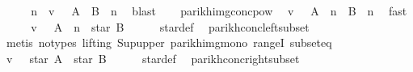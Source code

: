 \begin{isabellebody}
\ \ \isamarkupfalse%
\ \isamarkupfalse%
\ n\ \ {\isachardoublequoteopen}v\ {\isasymin}\ {\isasymPsi}\ {\isacharparenleft}{\kern0pt}{\isacharparenleft}{\kern0pt}A\ {\isacharat}{\kern0pt}{\isacharat}{\kern0pt}\ B{\isacharparenright}{\kern0pt}\ {\isacharcircum}{\kern0pt}{\isacharcircum}{\kern0pt}\ n{\isacharparenright}{\kern0pt}{\isachardoublequoteclose}\ \isamarkupfalse%
\ blast\isanewline
\ \ \isamarkupfalse%
\ parikh{\isacharunderscore}{\kern0pt}img{\isacharunderscore}{\kern0pt}conc{\isacharunderscore}{\kern0pt}pow\ \isamarkupfalse%
\ {\isachardoublequoteopen}v\ {\isasymin}\ {\isasymPsi}\ {\isacharparenleft}{\kern0pt}A\ {\isacharcircum}{\kern0pt}{\isacharcircum}{\kern0pt}\ n\ {\isacharat}{\kern0pt}{\isacharat}{\kern0pt}\ B\ {\isacharcircum}{\kern0pt}{\isacharcircum}{\kern0pt}\ n{\isacharparenright}{\kern0pt}{\isachardoublequoteclose}\ \isamarkupfalse%
\ fast\isanewline
\ \ \isamarkupfalse%
\ \isamarkupfalse%
\ {\isachardoublequoteopen}v\ {\isasymin}\ {\isasymPsi}\ {\isacharparenleft}{\kern0pt}A\ {\isacharcircum}{\kern0pt}{\isacharcircum}{\kern0pt}\ n\ {\isacharat}{\kern0pt}{\isacharat}{\kern0pt}\ star\ B{\isacharparenright}{\kern0pt}{\isachardoublequoteclose}\isanewline
\ \ \ \ \isamarkupfalse%
\ star{\isacharunderscore}{\kern0pt}def\ \isamarkupfalse%
\ parikh{\isacharunderscore}{\kern0pt}conc{\isacharunderscore}{\kern0pt}left{\isacharunderscore}{\kern0pt}subset\isanewline
\ \ \ \ \isamarkupfalse%
\ {\isacharparenleft}{\kern0pt}metis\ {\isacharparenleft}{\kern0pt}no{\isacharunderscore}{\kern0pt}types{\isacharcomma}{\kern0pt}\ lifting{\isacharparenright}{\kern0pt}\ Sup{\isacharunderscore}{\kern0pt}upper\ parikh{\isacharunderscore}{\kern0pt}img{\isacharunderscore}{\kern0pt}mono\ rangeI\ subset{\isacharunderscore}{\kern0pt}eq{\isacharparenright}{\kern0pt}\isanewline
\ \ \isamarkupfalse%
\ \isamarkupfalse%
\ {\isachardoublequoteopen}v\ {\isasymin}\ {\isasymPsi}\ {\isacharparenleft}{\kern0pt}star\ A\ {\isacharat}{\kern0pt}{\isacharat}{\kern0pt}\ star\ B{\isacharparenright}{\kern0pt}{\isachardoublequoteclose}\isanewline
\ \ \ \ \isamarkupfalse%
\ star{\isacharunderscore}{\kern0pt}def\ \isamarkupfalse%
\ parikh{\isacharunderscore}{\kern0pt}conc{\isacharunderscore}{\kern0pt}right{\isacharunderscore}{\kern0pt}subset\isanewline
\ \ \ \ \isamarkupfalse%

\end{isabellebody}
